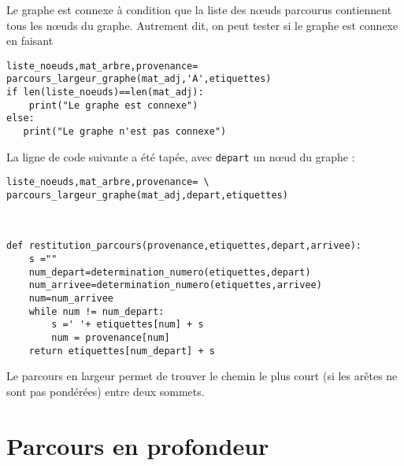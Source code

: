\ifprof
\begin{corrige}
Le graphe est connexe à condition que la liste des n\oe{}uds parcourus contiennent tous les n\oe{}uds du graphe. Autrement dit, on peut tester si le graphe est connexe en faisant
\begin{lstlisting}
liste_noeuds,mat_arbre,provenance= parcours_largeur_graphe(mat_adj,'A',etiquettes)
if len(liste_noeuds)==len(mat_adj):
    print("Le graphe est connexe")
else:
   print("Le graphe n'est pas connexe")
\end{lstlisting}
\end{corrige}
\else
\fi

La ligne de code suivante a été tapée, avec \texttt{depart} un n\oe{}ud du graphe :

\begin{lstlisting}
liste_noeuds,mat_arbre,provenance= \
parcours_largeur_graphe(mat_adj,depart,etiquettes) 
\end{lstlisting}


\ifprof
\begin{corrige}~\\
\begin{lstlisting}
def restitution_parcours(provenance,etiquettes,depart,arrivee):
    s =""
    num_depart=determination_numero(etiquettes,depart)
    num_arrivee=determination_numero(etiquettes,arrivee)
    num=num_arrivee
    while num != num_depart:
        s =' '+ etiquettes[num] + s
        num = provenance[num]
    return etiquettes[num_depart] + s
\end{lstlisting}
\end{corrige}
\else
\fi


\begin{defi}{}
Le parcours en largeur permet de trouver le chemin le plus court (si les arêtes ne sont pas pondérées) entre deux sommets.
\end{defi}


\section*{Parcours en profondeur}


